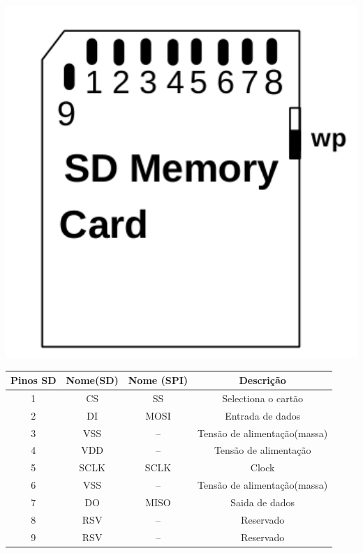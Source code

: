   \begin{minipage}{\textwidth}
  \begin{minipage}[b]{0.20\textwidth}
    \centering
    \includegraphics[width=1\textwidth]{Figures/sd_card.pdf}
    \label{fig:cartao_SD}
  \end{minipage}
  \hfill
  \begin{minipage}[b]{0.99 \textwidth}
    \centering
    \begin{tabular}{c | c | c| c}\hline
      Pinos SD & Nome(SD) & Nome (SPI) & Descrição  \\ \hline
        1 & CS & SS & Selectiona o cartão \\
        2 & DI & MOSI & Entrada de dados\\
        3 & VSS & -- & Tensão de alimentação(massa) \\
        4 & VDD & -- & Tensão de alimentação \\
        5 & SCLK & SCLK & Clock \\
        6 & VSS & -- & Tensão de alimentação(massa) \\
        7 & DO & MISO & Saida de dados\\
        8 & RSV & -- & Reservado  \\
        9 & RSV & -- & Reservado \\ \hline
      \end{tabular}
      \label{table:pin_sd_card}
    \end{minipage}
  \end{minipage}

